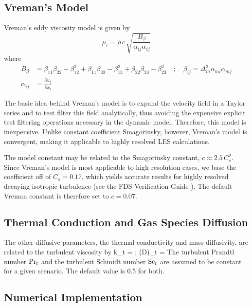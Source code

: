\subsection{Vreman's Model}
\label{sec:vreman}

Vreman's eddy viscosity model \cite{vreman:2004} is given by
\begin{equation}
\label{eqn_mu_vreman}
\mu_t = \rho \, c \, \sqrt{ \frac{B_\beta}{\alpha_{ij}\alpha_{ij}} }
\end{equation}
where
\begin{align}
B_\beta     &= \beta_{11}\beta_{22} - \beta_{12}^2 + \beta_{11}\beta_{33} - \beta_{13}^2 + \beta_{22}\beta_{33} - \beta_{23}^2 \quad ; \quad \beta_{ij} = \Delta_m^2 \alpha_{mi} \alpha_{mj} \\
\alpha_{ij} &= \frac{\partial u_j}{\partial x_i}
\end{align}

The basic idea behind Vreman's model is to expand the velocity field in a Taylor series and to test filter this field analytically, thus avoiding the expensive explicit test filtering operations necessary in the dynamic model.  Therefore, this model is inexpensive.  Unlike constant coefficient Smagorinsky, however, Vreman's model is convergent, making it applicable to highly resolved LES calculations.

The model constant may be related to the Smagorinsky constant, $c \approx 2.5 \, C_s^2$.  Since Vreman's model is most applicable to high resolution cases, we base the coefficient off of $C_s = 0.17$, which yields accurate results for highly resolved decaying isotropic turbulence (see the FDS Verification Guide \cite{FDS_Verification_Guide}).  The default Vreman constant is therefore set to $c = 0.07$.

\subsection{Thermal Conduction and Gas Species Diffusion}

The other diffusive parameters,
the thermal conductivity and mass diffusivity, are related to the turbulent viscosity by
\be k_t = 
\quad ; \quad
 (\rho D)_t = \ee
The turbulent Prandtl number $\hbox{Pr}_t$ and the turbulent Schmidt number $\hbox{Sc}_t$ are assumed to be constant for a given scenario.  The default value is 0.5 for both.

\subsection{Numerical Implementation}


